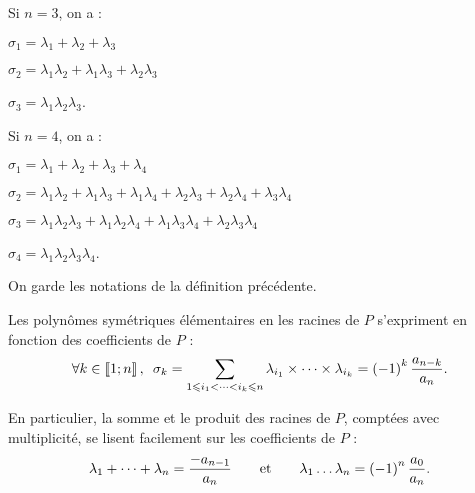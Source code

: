 \begin{ex}
Si \(n=3\), on a :

\begin{description}
\item \(\sigma_1=\lambda_1+\lambda_2+\lambda_3\) \\

\item \(\sigma_2=\lambda_1\lambda_2+\lambda_1\lambda_3+\lambda_2\lambda_3\) \\

\item \(\sigma_3=\lambda_1\lambda_2\lambda_3\).
\end{description}

Si \(n=4\), on a :

\begin{description}
\item \(\sigma_1=\lambda_1+\lambda_2+\lambda_3+\lambda_4\) \\

\item \(\sigma_2=\lambda_1\lambda_2+\lambda_1\lambda_3+\lambda_1\lambda_4+\lambda_2\lambda_3+\lambda_2\lambda_4+\lambda_3\lambda_4\) \\

\item \(\sigma_3=\lambda_1\lambda_2\lambda_3+\lambda_1\lambda_2\lambda_4+\lambda_1\lambda_3\lambda_4+\lambda_2\lambda_3\lambda_4\) \\

\item \(\sigma_4=\lambda_1\lambda_2\lambda_3\lambda_4\).
\end{description}
\end{ex}

\begin{prop}
On garde les notations de la définition précédente.

Les polynômes symétriques élémentaires en les racines de \(P\) s'expriment en fonction des coefficients de \(P\) : \[\quantifs{\forall k\in\interventierii{1}{n}}\sigma_k=\sum_{1\leq i_1<\dots<i_k\leq n}\lambda_{i_1}\times\dots\times\lambda_{i_k}=\paren{-1}^k\dfrac{a_{n-k}}{a_n}.\]

En particulier, la somme et le produit des racines de \(P\), comptées avec multiplicité, se lisent facilement sur les coefficients de \(P\) : \[\lambda_1+\dots+\lambda_n=\dfrac{-a_{n-1}}{a_n}\qquad\text{et}\qquad\lambda_1\dots\lambda_n=\left(-1\right)^n\dfrac{a_0}{a_n}.\]
\end{prop}

